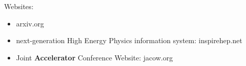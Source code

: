 Websites:
\begin{itemize}
    \item arxiv.org
    \item next-generation High Energy Physics information system: inspirehep.net
    \item Joint \textbf{Accelerator} Conference Website: jacow.org
\end{itemize}
